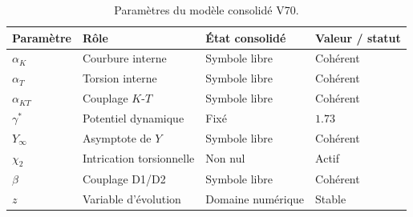 \begin{table}[htbp]
\centering
\caption{Paramètres du modèle consolidé V70.}
\begin{tabular}{>{\raggedright\arraybackslash}p{3.8cm} >{\raggedright\arraybackslash}p{4cm} >{\raggedright\arraybackslash}p{3.8cm} >{\raggedright\arraybackslash}p{3cm}}
\toprule
Paramètre & Rôle & État consolidé & Valeur / statut \\
\midrule
$\alpha_K$ & Courbure interne & Symbole libre & Cohérent \\
$\alpha_T$ & Torsion interne & Symbole libre & Cohérent \\
$\alpha_{KT}$ & Couplage $K$-$T$ & Symbole libre & Cohérent \\
$\gamma^*$ & Potentiel dynamique & Fixé & $1.73$ \\
$Y_\infty$ & Asymptote de $Y$ & Symbole libre & Cohérent \\
$\chi_2$ & Intrication torsionnelle & Non nul & Actif \\
$\beta$ & Couplage D1/D2 & Symbole libre & Cohérent \\
$z$ & Variable d'évolution & Domaine numérique & Stable \\
\bottomrule
\end{tabular}
\end{table}